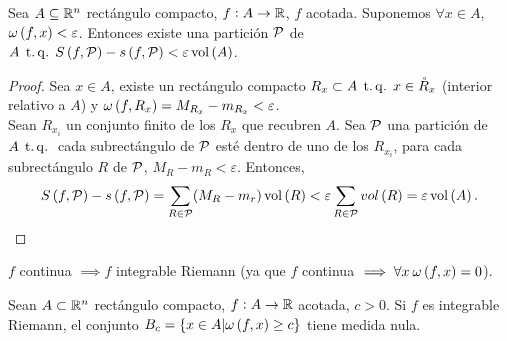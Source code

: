 \begin{lema}\label{lema:uno_lebesgue}
    Sea $A \subseteq \mathbb{R}^n$ rectángulo compacto, $f : A \to \mathbb{R}$, $f$ acotada. Suponemos $\forall x  \in A$, $\omega \left( f, x \right) < \varepsilon$. Entonces existe una partición $\mathcal{P}$ de $A \operatorname{\;t.q.\;} S \left( f, \mathcal{P} \right) - s \left( f, \mathcal{P} \right) < \varepsilon \operatorname{vol} \left( A \right)$.
\end{lema}
\begin{proof}
    Sea $x \in A$, existe un rectángulo compacto $R_x \subset A \operatorname{\;t.q.\;} x \in \mathring{R}_x$ (interior relativo a $A$) y $\omega \left( f, R_x \right) = M_{R_x} - m_{R_x} < \varepsilon$. \\
    Sean $R_{x_i}$ un conjunto finito de los $R_x$ que recubren $A$. Sea $\mathcal{P}$ una partición de $A \operatorname{\;t.q.\;}$ cada subrectángulo de $\mathcal{P}$ esté dentro de uno de los $R_{x_i}$, para cada subrectángulo $R$ de $\mathcal{P}$, $M_R - m_R < \varepsilon$. Entonces,
    \[ S \left( f,\mathcal{P} \right) - s \left( f,\mathcal{P} \right) = \sum_{R \in \mathcal{P}} (M_R - m_r) \operatorname{vol} \left( R \right) < \varepsilon \sum_{R \in \mathcal{P}} vol \left( R \right) = \varepsilon \operatorname{vol} \left( A \right). \]
\end{proof}
\begin{col*}
    $f$ continua $\implies f$ integrable Riemann (ya que $f$ continua $\implies \forall x \: \omega \left( f, x \right) = 0$).
\end{col*}
\begin{lema}[(2)]\label{lema:dos_lebesgue}
    Sean $A \subset \mathbb{R}^n$ rectángulo compacto, $f : A \to \mathbb{R}$ acotada, $c > 0$. Si $f$ es integrable Riemann, el conjunto $B_c = \{x \in A | \omega \left( f, x \right) \geq c\}$ tiene medida nula.
\end{lema}
